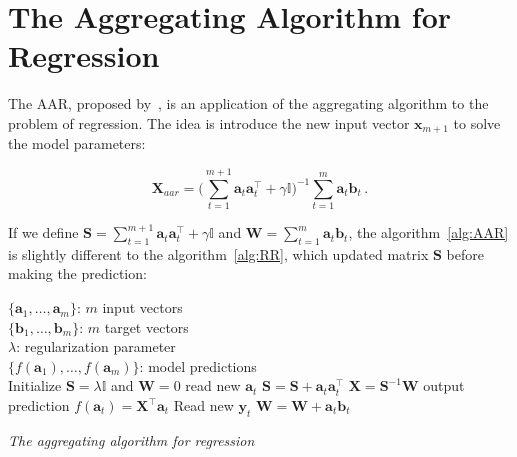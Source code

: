 \section{The Aggregating Algorithm for Regression}

The AAR, proposed by~\cite{vovk2001}, is an application of the aggregating
algorithm to the problem of regression. The idea is introduce the new input
vector $\mathbf{x}_{m+1}$ to solve the model parameters: 

\begin{equation}
\label{eq:AARexpand}
\mathbf{X}_{aar} = \displaystyle \big (\sum_{t=1}^{m+1}
\mathbf{a}_t \mathbf{a}_t  ^\intercal + \gamma \mathbb{I}\big )^{-1}
\sum_{t=1}^m \mathbf{a}_t \mathbf{b}_t \, .
\end{equation}

If we define $\displaystyle\mathbf{S}= \sum_{t=1}^{m+1} \mathbf{a}_t
\mathbf{a}_t  ^\intercal + \gamma \mathbb{I} $ and $\mathbf{W}=
\displaystyle\sum_{t=1}^m \mathbf{a}_t \mathbf{b}_t$, the
algorithm~\ref{alg:AAR} is slightly different to the algorithm~\ref{alg:RR}, 
which updated matrix $\mathbf{S}$ before making the prediction:

\begin{algorithm}[ht]
\begin{algorithmic}[1]
\REQUIRE $\,$ \\
$\{\mathbf{a}_1,\dots,\mathbf{a}_{m} \}$: $m$ input vectors \\
$\{\mathbf{b}_1,\dots,\mathbf{b}_{m} \}$: $m$ target vectors \\
$\lambda$: regularization parameter \\
\ENSURE  $\,$ \\
$\{f(\mathbf{a}_1),\dots,f(\mathbf{a}_{m}) \}$: model predictions \\
\STATE Initialize $\mathbf{S}=\lambda \mathbb{I}$
and $\mathbf{W}=0$
	\STATE read new $\mathbf{a}_t$
   	\STATE $\mathbf{S} = \mathbf{S} + \mathbf{a}_t \mathbf{a}_t^\intercal$
	\STATE $\mathbf{X}=\mathbf{S}^{-1}\mathbf{W}$
	\STATE output prediction $f(\mathbf{a}_t) = \mathbf{X}^\intercal \mathbf{a}_t$
   	\STATE Read new $\mathbf{y}_t$
    	\STATE $\mathbf{W} = \mathbf{W} + \mathbf{a}_t \mathbf{b}_t$
\ENDFOR
\end{algorithmic}
\caption{{\em The aggregating algorithm for regression}}
\label{alg:AAR}
\end{algorithm}



